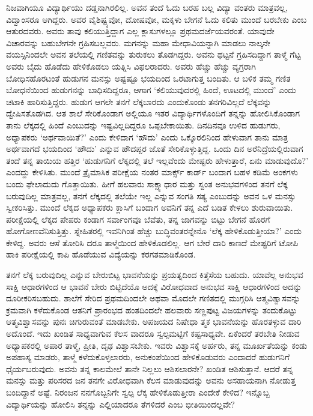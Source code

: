 ನಿಜವಾಗಿಯೂ ವಿದ್ಯಾರ್ಥಿಯು ದಡ್ಡನಾಗಿರಲಿಲ್ಲ. ಅವನ ತಂದೆ ಓದು ಬರಹ ಬಲ್ಲ ವಿದ್ಯಾ ವಂತರು ಮಾತ್ರವಲ್ಲ, ವಿದ್ವಾಂಸರೂ ಆಗಿದ್ದರು. ಅವರ ವೈಶಿಷ್ಟ್ಯವೋ, ದೋಷವೋ, ಮಕ್ಕಳು ಬೇಗನೆ ಓದು ಕಲಿತು ಮುಂದೆ ಬರಬೇಕು ಎಂಬ ಆತುರದವರು. ಅವರು ತಾವು ಕಲಿಯುತ್ತಿದ್ದಾಗ ಎಲ್ಲ ಕ್ಲಾಸುಗಳಲ್ಲೂ ಪ್ರಥಮದರ್ಜೆಯವರಂತೆ. ಯಾವುದೇ ವಿಚಾರವನ್ನು ಬಹುಬೇಗನೇ ಗ್ರಹಿಸಬಲ್ಲವರು. ಮಗನನ್ನು ಮಹಾ ಮೇಧಾವಿಯನ್ನಾಗಿ ಮಾಡಲು ನಾಲ್ಕನೇ ವಯಸ್ಸಿನಿಂದಲೇ ಅವನ ತಲೆಯಲ್ಲಿ ಗಣಿತವನ್ನು ತುರುಕಲು ತೊಡಗಿದ್ದರು. ಅವನು ಥಟ್ಟನೆ ಗ್ರಹಿಸದಿದ್ದಾಗ ತಾಳ್ಮೆ ಗೆಟ್ಟ ಅವರು ಬೈದು ಹೊಡೆದು ಹೇಳಿಕೊಡಲು ಯತ್ನಿಸಿ ವಿಫಲರಾದರು. ಅವರು ಹೆಚ್ಚು ಹೆಚ್ಚು ವ್ಯಗ್ರರಾಗಿ ಬೋಧಿಸಹೊರಟಂತೆ ಹುಡುಗನ ಮನಸ್ಸು ಅಷ್ಟಷ್ಟೂ ಭಯದಿಂದ ಒರಟಾಗುತ್ತ ಬಂದಿತು. ಆ ಬಳಿಕ ತಮ್ಮ ಗಣಿತ ಬೋಧನೆಯಿಂದ ಹುಡುಗನನ್ನು ಬಾಧಿಸದಿದ್ದರೂ, ಆಗಾಗ ‘ಕಲಿಯುವುದರಲ್ಲಿ ಹಿಂದೆ, ಊಟದಲ್ಲಿ ಮುಂದೆ’ ಎಂದು ಚಟಾಕಿ ಹಾರಿಸುತ್ತಿದ್ದರು. ಹುಡುಗ ಆಗಲೇ ತನಗೆ ಲೆಕ್ಕಬಾರದು ಎಂದುಕೊಂಡು ತನಗರಿವಿಲ್ಲದೆ ಲೆಕ್ಕವನ್ನು ದ್ವೇಷಿಸತೊಡಗಿದ. ಆತ ಶಾಲೆ ಸೇರಿಕೊಂಡಾಗ ಅಲ್ಲಿಯೂ ಇತರ ವಿದ್ಯಾರ್ಥಿಗಳೊಂದಿಗೆ ತನ್ನನ್ನು ಹೋಲಿಸಿಕೊಂಡಾಗ ತಾನು ಲೆಕ್ಕದಲ್ಲಿ ಹಿಂದೆ ಎಂಬುದನ್ನು ಇಷ್ಟವಿಲ್ಲದಿದ್ದರೂ ಒಪ್ಪಬೇಕಾಯಿತು. ದಿನದಿನವೂ ಉಳಿದ ಹುಡುಗರು, ಅಧ್ಯಾಪಕರು ‘ಅರ್ಥವಾಯಿತೆ?’ ಎಂದು ಕೇಳಿದಾಗ ‘ಹೌದು’ ಎಂದು ಒಕ್ಕೊರಲಿನಿಂದ ಹೇಳುವಾಗ ತಾನು ಮಾತ್ರ ಅರ್ಥವಾಗದೆ ಭಯದಿಂದ ‘ಹೌದು’ ಎನ್ನುವ ಹೌದಪ್ಪರ ಜೊತೆ ಸೇರಿಕೊಳ್ಳುತ್ತಿದ್ದ. ಒಂದು ದಿನ ಅರೆನಿದ್ರೆಯಲ್ಲಿರುವಾಗ ತಂದೆ ತನ್ನ ತಾಯಿಯ ಹತ್ತಿರ ‘ಹುಡುಗನಿಗೆ ಲೆಕ್ಕದಲ್ಲಿ ತಲೆ ಇಲ್ಲವೆಂದು ಮೇಷ್ಟರು ಹೇಳುತ್ತಾರೆ, ಏನು ಮಾಡುವುದೊ?’ ಎಂದದ್ದು ಕೇಳಿಸಿತು. ಮುಂದೆ ತ್ರೈಮಾಸಿಕ ಪರೀಕ್ಷೆಯ ನಂತರ ಮಾರ್ಕ್ಸ್ ಕಾರ್ಡ್ ಬಂದಾಗ ಬಹಳ ಕಡಿಮೆ ಅಂಕಗಳು ಬಂದು ಫೇಲಾದುದು ಗೊತ್ತಾಯಿತು. ಹೀಗೆ ಹಲವಾರು ಸಾಕ್ಷ್ಯಾಧಾರ ಮತ್ತು ಸ್ವಂತ ಅನುಭವಗಳಿಂದ ತನಗೆ ಲೆಕ್ಕ ಬರುವುದಿಲ್ಲ ಮಾತ್ರವಲ್ಲ, ತನಗೆ ಲೆಕ್ಕದಲ್ಲಿ ತಲೆಯೇ ಇಲ್ಲ ಎನ್ನುವ ಸಂಗತಿ ಸತ್ಯ ಎಂಬುದನ್ನು ಅವನ ಒಳ ಮನಸ್ಸು ಸ್ವೀಕರಿಸಿತ್ತು. ಮುಂದೆ ಲೆಕ್ಕದ ಅಧ್ಯಾಪಕರು ಕ್ಲಾಸಿಗೆ ಬಂದಾಗ ಅವನಿಗೆ ತನ್ನ ಎದೆ ಬಡಿತ ಕೇಳಲು ಶುರುವಾಯಿತು. ಪರೀಕ್ಷೆಯಲ್ಲಿ ಲೆಕ್ಕದ ಪೇಪರು ಕಂಡಾಗ ಸರ್ವಾಂಗವೂ ಬೆವೆತು, ತನ್ನ ಜಾಗವನ್ನು ಬಿಟ್ಟು ಬೇಗನೆ ಹೊರಗೆ ಹೋಗೋಣವೆನಿಸುತ್ತಿತ್ತು. ಸ್ನೇಹಿತರಲ್ಲಿ ಇವನಿಗಿಂತ ಹೆಚ್ಚು ಬುದ್ಧಿವಂತರನ್ನೇನೊ ‘ಲೆಕ್ಕ ಹೇಳಿಕೊಡುತ್ತೀಯಾ?’ ಎಂದು ಕೇಳಿದ್ದ. ಅವರು ಆಸೆ ತೋರಿಸಿ ದರೂ ತಾಳ್ಮೆಯಿಂದ ಹೇಳಿಕೊಡಲಿಲ್ಲ. ಆಗ ಬೇರೆ ದಾರಿ ಕಾಣದೆ ಮೇಷ್ಟರಿಗೆ ಟೋಪಿ ಹಾಕಿ ಪರೀಕ್ಷೆಯಲ್ಲಿ ಕಾಪಿ ಹೊಡೆಯುವ ವಿದ್ಯೆಯನ್ನು ಕರಗತಮಾಡಿಕೊಂಡ.

ತನಗೆ ಲೆಕ್ಕ ಬರುವುದಿಲ್ಲ ಎನ್ನುವ ಬೇರುಬಿಟ್ಟ ಭಾವನೆಯನ್ನು ಪ್ರಯತ್ನದಿಂದ ಕಿತ್ತೆಸೆಯ ಬಹುದು. ಯಾವೆಲ್ಲ ಅನುಭವ ಸಾಕ್ಷಿ ಆಧಾರಗಳಿಂದ ಆ ಭಾವನೆ ಬೇರು ಬಿಟ್ಟಿದೆಯೊ ಅದಕ್ಕೆ ವಿರೋಧವಾದ ಅನುಭವ ಸಾಕ್ಷಿ ಆಧಾರಗಳಿಂದ ಅದನ್ನು ದೂರೀಕರಿಸಬಹುದು. ಶಾಲೆಗೆ ಸೇರಿದ ಪ್ರಥಮದಿಂದಲೇ ಅಥವಾ ಮೊದಲೇ ಗಣಿತದಲ್ಲಿ ಮುಗ್ಗರಿಸಿ ಆತ್ಮವಿಶ್ವಾಸವನ್ನು ಕ್ರಮವಾಗಿ ಕಳೆದುಕೊಂಡ ಆತನಿಗೆ ಪ್ರಾರಂಭದ ಹಂತದಿಂದಲೇ ಹಲವಾರು ಸಣ್ಣಪುಟ್ಟ ವಿಜಯಗಳನ್ನು ತಂದುಕೊಟ್ಟು ಆತ್ಮವಿಶ್ವಾಸವನ್ನು ಪುನಃ ಚಿಗುರುವಂತೆ ಮಾಡಬೇಕು. ಅಪಜಯದ ನಿಷೇಧಾ ತ್ಮಕ ಭಾವನೆಯನ್ನು ಹೊರತಳ್ಳುವ ದಾರಿ ಅದೊಂದೆ. ಇದು ಖಂಡಿತ ಸಾಧ್ಯವಾಗುವ ಕೆಲಸ ವಾದರೂ ಸ್ವಲ್ಪಮಟ್ಟಿಗೆ ಕಷ್ಟಸಾಧ್ಯವೇ. ಏಕೆಂದರೆ ತರಬೇತಿ ನೀಡುವ ಅಧ್ಯಾಪಕರಲ್ಲಿ ಅಪಾರ ತಾಳ್ಮೆ, ಪ್ರೀತಿ, ದೃಢ ವಿಶ್ವಾಸಬೇಕು. ಇವರು ವಿಶ್ವಾಸಕ್ಕೆ ಅರ್ಹರು, ತನ್ನ ಮೂರ್ಖತೆಯನ್ನು ಕಂಡು ಅಪಹಾಸ್ಯ ಮಾಡರು, ತಾಳ್ಮೆ ಕಳೆದುಕೊಳ್ಳಲಾರರು, ಅನುಕಂಪೆಯಿಂದ ಹೇಳಿಕೊಡುವರು ಎಂದಾದರೆ ಹುಡುಗನಿಗೆ ಧೈರ್ಯಬರುವುದು. ಅವನು ತನ್ನ ಕಾಲಮೇಲೆ ತಾನೇ ನಿಲ್ಲಲು ಆಶಿಸಲಾರನೇ? ಖಂಡಿತ ಆಶಿಸುತ್ತಾನೆ. ಆದರೆ ತನ್ನ ಮನಸ್ಸು ಮತ್ತು ಪರಿಸರದ ಜನ ತನಗೇ ವಿರೋಧವಾಗಿ ಕೆಲಸ ಮಾಡುವುದನ್ನು ಅವನು ಅಸಹಾಯನಾಗಿ ನೋಡುತ್ತ ಬಂದಿದ್ದಾನೆ ಅಷ್ಟೆ. ನಿರಂಜನ ನನಗೊಬ್ಬನಿಗೇ ಸ್ವಲ್ಪ ಲೆಕ್ಕ ಹೇಳಿಕೊಡುತ್ತೀರಾ ಎಂದೇಕೆ ಕೇಳಿದ? ಇನ್ನೊಬ್ಬ ವಿದ್ಯಾರ್ಥಿಯನ್ನು ಹೋಲಿಸಿ ತನ್ನನ್ನು ಎಲ್ಲಿಯಾದರೂ ತೆಗಳಿದರೆ ಎಂಬ ಭೀತಿಯಿಂದಲ್ಲವೇ?

